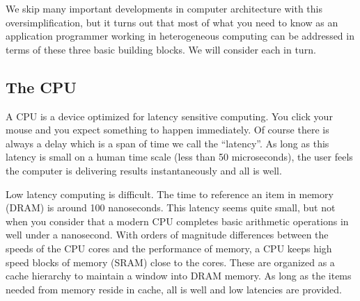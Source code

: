 We skip many important developments in computer architecture with this oversimplification, but 
it turns out that most of what you need to know as an application programmer working in 
heterogeneous computing can be addressed in terms of these three basic building blocks.
We will consider each in turn.

\subsection{The CPU}

A CPU is a device optimized for latency sensitive computing.  You click your mouse and you expect something to happen
immediately.  Of course there is always a delay which is a span of time we call the ``latency''.  As long as this
latency is small on a human time scale (less than 50 microseconds), the user feels the computer is delivering results
instantaneously and  all is well.  

Low latency computing is difficult.  The time to reference an item in memory (DRAM) is around 100 nanoseconds.  This latency
seems quite small, but not when you consider that a modern CPU completes basic arithmetic operations in well
under a nanosecond.  With orders of magnitude differences between the speeds of the CPU cores and the performance
of memory, a CPU keeps high speed blocks of memory (SRAM) close to the cores.  These are organized as a 
cache hierarchy to maintain a window into DRAM memory.  As long as the items needed from memory 
reside in cache, all is well and low latencies are provided.  

